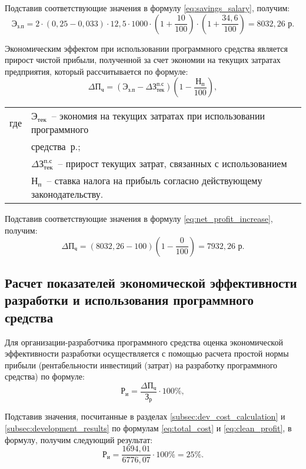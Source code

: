 Подставив соответствующие значения в формулу \ref{eq:savings_salary}, получим:
\[
\mathrm{Э_{з.п}} = 2 \cdot (0{,}25 - 0{,}033 ) \cdot 12{,}5 \cdot 1000 \cdot \left(1 + \frac{10}{100}\right) \cdot \left(1 + \frac{34{,}6}{100}\right) = 8032{,}26  \text{ р}.
\]

Экономическим эффектом при использовании программного средства является прирост чистой прибыли, полученной за счет экономии на текущих затратах предприятия, который рассчитывается по формуле:
\begin{equation}
	\label{eq:net_profit_increase}
	\Delta \mathrm{П_{ч}} = (\mathrm{Э_{з.п}} - \Delta \text{З}_\text{тек}^{\text{п.с}}) \left( 1 - \frac{\mathrm{Н_{п}}}{100} \right),
\end{equation}

\noindent\begin{tabular}{ll}
	где& \mbox{$\mathrm{Э_{тек}}$ --} экономия на текущих затратах при использовании программного \\
	& \mbox{средства р.;} \\
	& \mbox{$\Delta \text{З}_\text{тек}^{\text{п.с}}$ --} прирост текущих затрат, связанных с использованием \\
	& \mbox{$\mathrm{Н_{п}}$ --}  ставка налога на прибыль согласно действующему законодательству. \\
\end{tabular}


Подставив соответствующие значения в формулу \ref{eq:net_profit_increase}, получим:
\[
\Delta \mathrm{П_{ч}} = (8032{,}26 - 100) \left(1 - \frac{0}{100}\right) = 7932{,}26 \text{ р}.
\]

\subsection{Расчет показателей экономической эффективности разработки и использования программного средства} 

Для организации-разработчика программного средства оценка экономической эффективности разработки осуществляется с помощью расчета простой нормы прибыли (рентабельности инвестиций (затрат) на разработку программного средства) по формуле:
\begin{equation}
	\label{eq:roi}
	\mathrm{Р_{и}} = \frac{\Delta \mathrm{П_{ч}}}{\mathrm{З_{р}}} \cdot 100\%,
\end{equation}

Подставив значения, посчитанные в разделах \ref{subsec:dev_cost_calculation} и \ref{subsec:development_results}   по формулам \ref{eq:total_cost} и \ref{eq:clean_profit}, в формулу, получим следующий результат:
\[
\mathrm{Р_{и}} = \frac{1694{,}01}{6776{,}07} \cdot 100\% = 25\%.
\]

